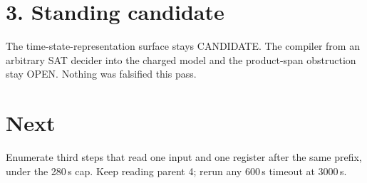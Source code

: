 \documentclass[11pt]{article}
\begin{document}
\section*{3. Standing candidate}
The time-state-representation surface stays CANDIDATE. The compiler from an arbitrary SAT decider into the charged model and the product-span obstruction stay OPEN. Nothing was falsified this pass.

\section*{Next}
Enumerate third steps that read one input and one register after the same prefix, under the 280\,s cap. Keep reading parent 4; rerun any 600\,s timeout at 3000\,s.
\end{document}
